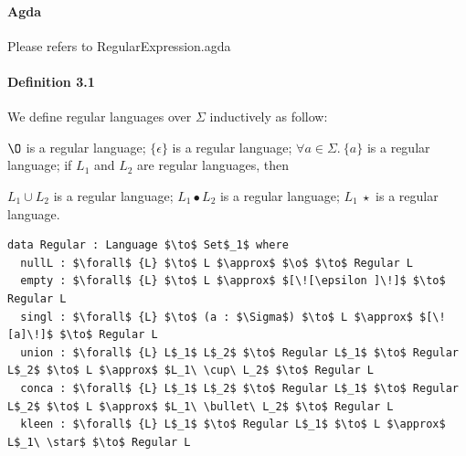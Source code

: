 \documentclass[twoside,openright,final]{bhamthesis}
\renewcommand{\item}{\itemindent0.5cm\itemold}
\begin{document}
\paragraph{Agda} Please refers to RegularExpression.agda

\paragraph{Definition 3.1} We define regular languages over
\(\Sigma\) inductively as follow:
\begin{enumerate}[nolistsep]
  \item \(\O\) is a regular language;
  \item \(\{\epsilon\}\) is a regular language;
  \item \(\forall a\in\Sigma.\ \{a\}\) is a regular language;
  \item if \(L_1\) and \(L_2\) are regular languages, then
    \begin{enumerate}[nolistsep]
      \item \(L_1\cup L_2\) is a regular language;
      \item \(L_1\bullet L_2\) is a regular language;
      \item \(L_1\ \star\) is a regular language.
    \end{enumerate}
\end{enumerate}
\vspace{1pc}
\begin{lstlisting}[caption=Regular languages,mathescape=true]
data Regular : Language $\to$ Set$_1$ where
  nullL : $\forall$ {L} $\to$ L $\approx$ $\o$ $\to$ Regular L
  empty : $\forall$ {L} $\to$ L $\approx$ $[\![\epsilon ]\!]$ $\to$ Regular L
  singl : $\forall$ {L} $\to$ (a : $\Sigma$) $\to$ L $\approx$ $[\![a]\!]$ $\to$ Regular L
  union : $\forall$ {L} L$_1$ L$_2$ $\to$ Regular L$_1$ $\to$ Regular L$_2$ $\to$ L $\approx$ $L_1\ \cup\ L_2$ $\to$ Regular L
  conca : $\forall$ {L} L$_1$ L$_2$ $\to$ Regular L$_1$ $\to$ Regular L$_2$ $\to$ L $\approx$ $L_1\ \bullet\ L_2$ $\to$ Regular L
  kleen : $\forall$ {L} L$_1$ $\to$ Regular L$_1$ $\to$ L $\approx$ L$_1\ \star$ $\to$ Regular L
\end{lstlisting}
\end{document}
